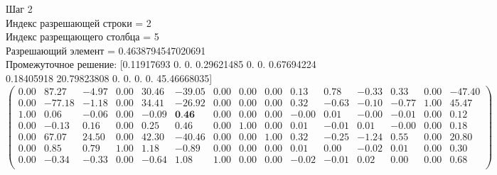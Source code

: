 \documentclass[draft]{article}
\begin{document}
\begin{flushleft}
    Шаг 2 \\
    Индекс разрешающей строки = 2\\
    Индекс разрещающего столбца = 5\\
    Разрешающий элемент = 0.4638794547020691\\
    Промежуточное решение:
    [0.11917693  0.  0.  0.29621485  0.  0.  0.67694224  0.18405918  20.79823808  0.  0.  0.  0.  45.46668035]
\begin{equation*}
\begin{pmatrix}
    0.00 &  87.27 & -4.97 & 0.00 & 30.46 & -39.05 & 0.00 & 0.00 & 0.00 &  0.13 &  0.78 & -0.33 &  0.33 & 0.00 & -47.40 \\
    0.00 & -77.18 & -1.18 & 0.00 & 34.41 & -26.92 & 0.00 & 0.00 & 0.00 &  0.32 & -0.63 & -0.10 & -0.77 & 1.00 &  45.47 \\
    1.00 &   0.06 & -0.06 & 0.00 & -0.09 &   \textbf{0.46} & 0.00 & 0.00 & 0.00 & -0.00 &  0.01 & -0.00 & -0.01 & 0.00 &   0.12 \\
    0.00 &  -0.13 &  0.16 & 0.00 &  0.25 &   0.46 & 0.00 & 1.00 & 0.00 &  0.01 & -0.01 &  0.01 & -0.00 & 0.00 &   0.18 \\
    0.00 &  67.07 & 24.50 & 0.00 & 42.30 & -40.46 & 0.00 & 0.00 & 1.00 &  0.32 & -0.25 & -1.24 &  0.55 & 0.00 &  20.80 \\
    0.00 &   0.85 &  0.79 & 1.00 &  1.18 &  -0.89 & 0.00 & 0.00 & 0.00 &  0.01 &  0.00 & -0.02 &  0.01 & 0.00 &   0.30 \\
    0.00 &  -0.34 & -0.33 & 0.00 & -0.64 &   1.08 & 1.00 & 0.00 & 0.00 & -0.02 & -0.01 &  0.02 &  0.00 & 0.00 &   0.68 \\
\end{pmatrix}
\end{equation*}
\end{flushleft}
\end{document}
